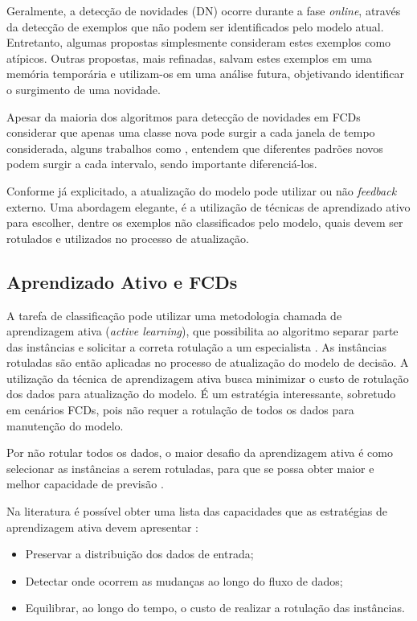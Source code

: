 \documentclass[qual, classic, a4paper]{ufbathesis}
\begin{document}
Geralmente, a detecção de novidades (DN) ocorre durante a fase \textit{online}, através da detecção de exemplos que não podem ser identificados pelo modelo atual. Entretanto, algumas propostas simplesmente consideram estes exemplos como atípicos. Outras propostas, mais refinadas, salvam estes exemplos em uma memória temporária e utilizam-os em uma análise futura, objetivando identificar o surgimento de uma novidade.

Apesar da maioria dos algoritmos para detecção de novidades em FCDs considerar que apenas uma classe nova pode surgir a cada janela de tempo considerada, alguns trabalhos como \cite{Masud:2010:ACC:1933307.1934606}, entendem que diferentes padrões novos podem surgir a cada intervalo, sendo importante diferenciá-los.

Conforme já explicitado, a atualização do modelo pode utilizar ou não \textit{feedback} externo. Uma abordagem elegante, é a utilização de técnicas de aprendizado ativo para escolher, dentre os exemplos não classificados pelo modelo, quais devem ser rotulados e utilizados no processo de atualização. 

\subsection{Aprendizado Ativo e FCDs}

A tarefa de classificação pode utilizar uma metodologia chamada de aprendizagem ativa (\textit{active learning}), que possibilita ao algoritmo separar parte das instâncias e solicitar a correta rotulação a um especialista \cite{Tong:2001}. As instâncias rotuladas são então aplicadas no processo de atualização do modelo de decisão.  A utilização da técnica de aprendizagem ativa busca minimizar o custo de rotulação dos dados para atualização do modelo. É um estratégia interessante, sobretudo em cenários FCDs, pois não requer a rotulação de todos os dados para manutenção do modelo.

Por não rotular todos os dados, o maior desafio da aprendizagem ativa é como selecionar as instâncias a serem rotuladas, para que se possa obter maior e melhor capacidade de previsão \cite{Tong:2001}.

Na literatura é possível obter uma lista das capacidades que as estratégias de aprendizagem ativa devem apresentar \cite{Ienco:2014}: 

\begin{itemize}
    \item Preservar a distribuição dos dados de entrada;
    \item Detectar onde ocorrem as mudanças ao longo do fluxo de dados;
    \item Equilibrar, ao longo do tempo, o custo de realizar a rotulação das instâncias.
\end{itemize}
\end{document}
